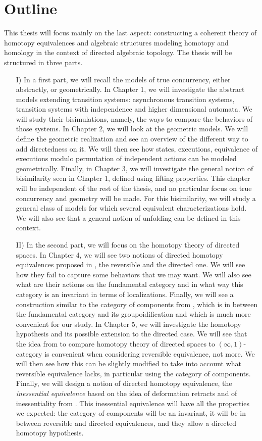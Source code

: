 \section*{Outline}

This thesis will focus mainly on the last aspect: constructing a coherent theory of homotopy equivalences and algebraic structures modeling homotopy and homology in the context of directed algebraic topology. The thesis will be structured in three parts.

\begin{itemize}
	\item[I)] In a first part, we will recall the models of true concurrency, either abstractly, or geometrically. In Chapter 1, we will investigate the abstract models extending transition systems: asynchronous transition systems, transition systems with independence and higher dimensional automata. We will study their bisimulations, namely, the ways to compare the behaviors of those systems. In Chapter 2, we will look at the geometric models. We will define the geometric realization and see an overview of the different way to add directedness on it. We will then see how states, executions, equivalence of executions modulo permutation of independent actions can be modeled geometrically. Finally, in Chapter 3, we will investigate the general notion of bisimilarity seen in Chapter 1, defined using lifting properties. This chapter will be independent of the rest of the thesis, and no particular focus on true concurrency and geometry will be made. For this bisimilarity, we will study a general class of models for which several equivalent characterizations hold. We will also see that a general notion of unfolding can be defined in this context.
	\item[II)] In the second part, we will focus on the homotopy theory of directed spaces. In Chapter 4, we will see two notions of directed homotopy equivalences proposed in \cite{grandis09}, the reversible and the directed one. We will see how they fail to capture some behaviors that we may want. We will also see what are their actions on the fundamental category and in what way this category is an invariant in terms of localizations. Finally, we will see a construction similar to the category of components from \cite{goubault07}, which is in between the fundamental category and its groupoidification and which is much more convenient for our study. In Chapter 5, we will investigate the homotopy hypothesis and its possible extension to the directed case. We will see that the idea from \cite{porter15} to compare homotopy theory of directed spaces to $(\infty,1)$-category is convenient when considering reversible equivalence, not more. We will then see how this can be slightly modified to take into account what reversible equivalence lacks, in particular using the category of components. Finally, we will design a notion of directed homotopy equivalence, the \emph{inessential equivalence} based on the idea of deformation retracts and of inessentiality from \cite{goubault07}. This inessential equivalence will have all the properties we expected: the category of components will be an invariant, it will be in between reversible and directed equivalences, and they allow a directed homotopy hypothesis.

\end{itemize}
